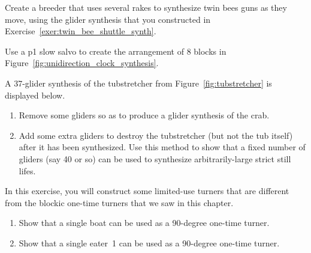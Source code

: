 \begin{multicols}{2}
\mfilbreak


\begin{problem}\label{exer:new_gun_breeder}
	Create a breeder that uses several rakes to synthesize twin bees guns as they move, using the glider synthesis that you constructed in Exercise~\ref{exer:twin_bee_shuttle_synth}.
\end{problem}


\mfilbreak


\begin{problem}\label{exer:slow_salvo_8_blocks}
	Use a p1 slow salvo to create the arrangement of $8$ blocks in Figure~\ref{fig:unidirection_clock_synthesis}.
\end{problem}


\mfilbreak


\begin{problem}\label{exer:large_still_life_synth}
	A 37-glider synthesis of the tubstretcher from Figure~\ref{fig:tubstretcher} is displayed below.
	\begin{center}
	\end{center}
	\begin{enumerate}[label=(\alph*)]
		\item Remove some gliders so as to produce a glider synthesis of the crab.
		
		\item Add some extra gliders to destroy the tubstretcher (but not the tub itself) after it has been synthesized. Use this method to show that a fixed number of gliders (say 40 or so) can be used to synthesize arbitrarily-large strict still lifes.
	\end{enumerate}
\end{problem}


\mfilbreak


\begin{problem}\label{exer:boat_one_time_turner}
	In this exercise, you will construct some limited-use turners that are different from the blockic one-time turners that we saw in this chapter.
	\begin{enumerate}[label=(\alph*)]
		\item Show that a single boat can be used as a 90-degree one-time turner.
		
		\item Show that a single eater~1 can be used as a 90-degree one-time turner.
		

\end{enumerate}
\end{problem}
\end{multicols}
